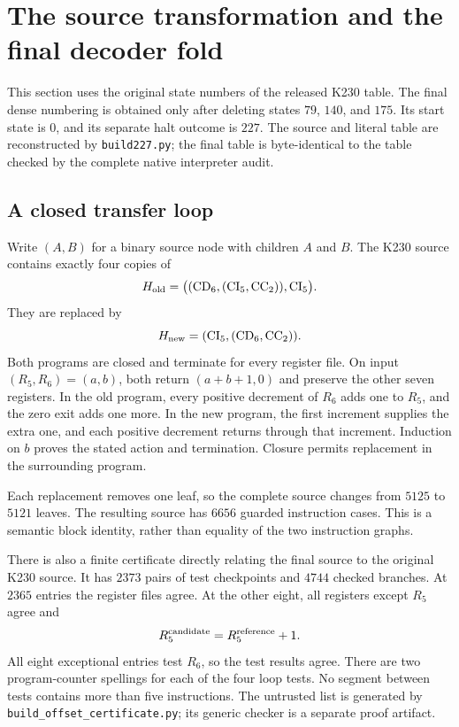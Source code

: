 \section{The source transformation and the final decoder fold}
\label{sec:k227-source-roles}

This section uses the original state numbers of the released K230 table.
The final dense numbering is obtained only after deleting states
$79$, $140$, and $175$.  Its start state is $0$, and its separate halt
outcome is $227$.  The source and literal table are reconstructed by
\texttt{build227.py}; the final table is byte-identical to the table checked
by the complete native interpreter audit.

\subsection{A closed transfer loop}

Write $(A,B)$ for a binary source node with children $A$ and $B$.
The K230 source contains exactly four copies of
\[
 H_{\rm old}
 =\bigl((\mathrm{CD}_6,(\mathrm{CI}_5,\mathrm{CC}_2)),
          \mathrm{CI}_5\bigr).
\]
They are replaced by
\[
 H_{\rm new}=(\mathrm{CI}_5,(\mathrm{CD}_6,\mathrm{CC}_2)).
\]
Both programs are closed and terminate for every register file.  On input
$(R_5,R_6)=(a,b)$, both return $(a+b+1,0)$ and preserve the other seven
registers.  In the old program, every positive decrement of $R_6$ adds one
to $R_5$, and the zero exit adds one more.  In the new program, the first
increment supplies the extra one, and each positive decrement returns
through that increment.  Induction on $b$ proves the stated action and
termination.  Closure permits replacement in the surrounding program.

Each replacement removes one leaf, so the complete source changes from
$5125$ to $5121$ leaves.  The resulting source has $6656$ guarded
instruction cases.  This is a semantic block identity, rather than
equality of the two instruction graphs.

There is also a finite certificate directly relating the final source to
the original K230 source.  It has $2373$ pairs of test checkpoints and
$4744$ checked branches.  At $2365$ entries the register files agree.
At the other eight, all registers except $R_5$ agree and
\[
 R^{\rm candidate}_5=R^{\rm reference}_5+1.
\]
All eight exceptional entries test $R_6$, so the test results agree.
There are two program-counter spellings for each of the four loop tests.
No segment between tests contains more than five instructions.  The
untrusted list is generated by \texttt{build\_offset\_certificate.py};
its generic checker is a separate proof artifact.

